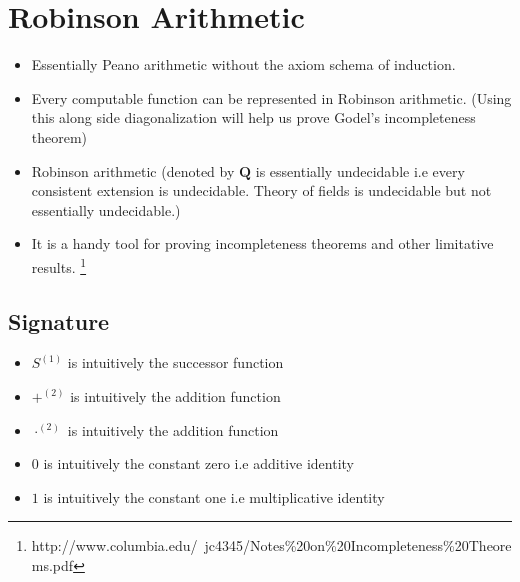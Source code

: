 \documentclass[
11pt,notheorems,hyperref={pdfauthor=whatever}
]{beamer}
\begin{document}
\section{Robinson Arithmetic}
\begin{frame}
\begin{itemize}
    \item Essentially Peano arithmetic without the axiom schema of induction.
    \item Every computable function can be represented in Robinson arithmetic. \cite{odifreddi1992classical} (Using this along side diagonalization will help us prove Godel's incompleteness theorem)
    \item Robinson arithmetic (denoted by $\textbf{Q}$ is essentially undecidable i.e every consistent extension is undecidable. Theory of fields is undecidable but not essentially undecidable.)
    \item It is a handy tool for proving incompleteness theorems and other limitative results. \footnote{http://www.columbia.edu/~jc4345/Notes\%20on\%20Incompleteness\%20Theorems.pdf}
\end{itemize}
\end{frame}

\subsection{Signature}
\begin{frame}
\begin{itemize}
    \item $S^{(1)}$ is intuitively the successor function
    \item $+^{(2)}$ is intuitively the addition function
    \item $\cdot^{(2)}$ is intuitively the addition function
    \item $0$ is intuitively the constant zero i.e additive identity
    \item $1$ is intuitively the constant one i.e multiplicative identity
\end{itemize}
\end{frame}
\end{document}
